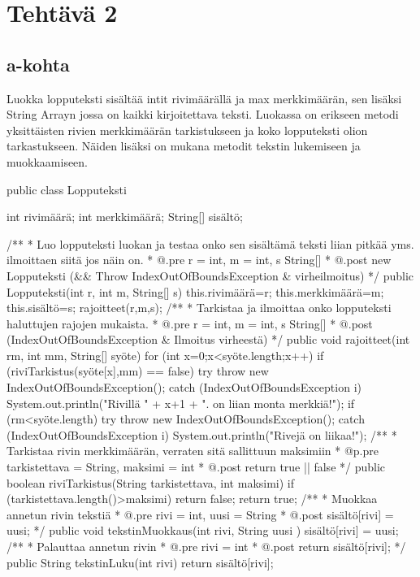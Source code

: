 
\chapter{Tehtävä 2 \label{chap:Teht=0000E4v=0000E4-2}}

\section{a-kohta}
\label{a-kohta}
Luokka lopputeksti sisältää intit rivimäärällä ja max merkkimäärän, sen lisäksi String Arrayn jossa on
kaikki kirjoitettava teksti. Luokassa on erikseen metodi yksittäisten rivien merkkimäärän tarkistukseen
ja koko lopputeksti olion tarkastukseen. Näiden lisäksi on mukana metodit tekstin lukemiseen ja
muokkaamiseen.
\begin{javacode}
public class Lopputeksti {
    int rivimäärä;
    int merkkimäärä;
    String[] sisältö;
    
    /**
     * Luo lopputeksti luokan ja testaa onko sen sisältämä teksti liian pitkää yms.
       ilmoittaen siitä jos näin on.
     * @.pre r = int, m = int, s String[]
     * @.post new Lopputeksti (&& Throw IndexOutOfBoundsException & virheilmoitus)
     */
    public Lopputeksti(int r, int m, String[] s) {
      this.rivimäärä=r;
      this.merkkimäärä=m;
      this.sisältö=s;
      rajoitteet(r,m,s);
    }
    /**
     * Tarkistaa ja ilmoittaa onko lopputeksti haluttujen rajojen mukaista.
     * @.pre r = int, m = int, s String[]
     * @.post (IndexOutOfBoundsException & Ilmoitus virheestä)
     */
    public void rajoitteet(int rm, int mm, String[] syöte) {
      for (int x=0;x<syöte.length;x++) {
        if (riviTarkistus(syöte[x],mm) == false) {
          try {
            throw new IndexOutOfBoundsException();
          } catch (IndexOutOfBoundsException i) {
              System.out.println("Rivillä " + x+1 + ". on liian monta merkkiä!");
          }
        }
      }
      if (rm<syöte.length) {
        try {
          throw new IndexOutOfBoundsException();
        } catch (IndexOutOfBoundsException i) {
            System.out.println("Rivejä on liikaa!");
        }
      }
    }
    /**
     * Tarkistaa rivin merkkimäärän, verraten sitä sallittuun maksimiin
     * @p.pre tarkistettava = String, maksimi = int
     * @.post return true || false
     */
    public boolean riviTarkistus(String tarkistettava, int maksimi) {
      if (tarkistettava.length()>maksimi) {
        return false;
      }
      return true;
    }
    /**
     * Muokkaa annetun rivin tekstiä
     * @.pre rivi = int, uusi = String
     * @.post sisältö[rivi] = uusi;
     */
    public void tekstinMuokkaus(int rivi, String uusi ) {
      sisältö[rivi] = uusi;
    }
    /**
     * Palauttaa annetun rivin
     * @.pre rivi = int
     * @.post return sisältö[rivi];
     */
    public String tekstinLuku(int rivi) {
      return sisältö[rivi];
    }
  }
\end{javacode}



